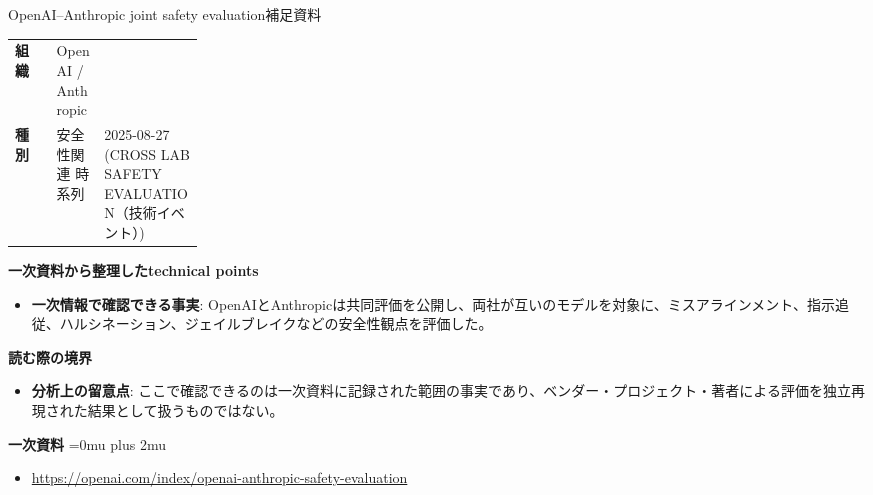 \begin{technicalnote}{OpenAI–Anthropic joint safety evaluation}{補足資料}
\begingroup
\begin{tabularx}{\linewidth}{@{}>{\bfseries}p{0.22\linewidth}X@{}}
組織 & OpenAI / Anthropic \\
種別 & 安全性関連
時系列 & 2025-08-27 (CROSS LAB SAFETY EVALUATION（技術イベント）) \\
\end{tabularx}
\smallskip
{\bfseries 一次資料から整理したtechnical points}
\begin{itemize}[leftmargin=1.5em,itemsep=0.35em]
\item \textbf{一次情報で確認できる事実}: OpenAIとAnthropicは共同評価を公開し、両社が互いのモデルを対象に、ミスアラインメント、指示追従、ハルシネーション、ジェイルブレイクなどの安全性観点を評価した。
\end{itemize}
\begin{minipage}{\linewidth}
{\bfseries 読む際の境界}
\begin{itemize}[leftmargin=1.5em,itemsep=0.35em]
\item \textbf{分析上の留意点}: ここで確認できるのは一次資料に記録された範囲の事実であり、ベンダー・プロジェクト・著者による評価を独立再現された結果として扱うものではない。
\end{itemize}
\begin{samepage}
{\bfseries 一次資料}
\begingroup\sloppy
\Urlmuskip=0mu plus 2mu\relax
\begin{itemize}[leftmargin=1.5em,itemsep=0.25em]
\item {\scriptsize\url{https://openai.com/index/openai-anthropic-safety-evaluation}}
\end{itemize}
\endgroup
\end{samepage}
\end{minipage}
\endgroup
\end{technicalnote}
\medskip
